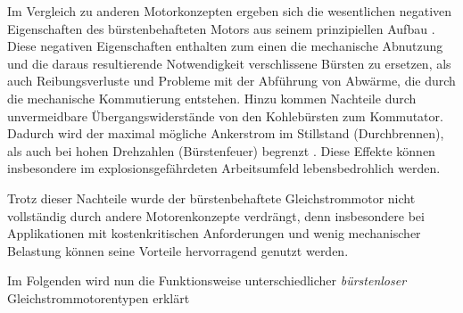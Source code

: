 \glqq{}Im  Vergleich  zu  anderen  Motorkonzepten  ergeben  sich  die  wesentlichen negativen Eigenschaften des bürstenbehafteten Motors aus seinem prinzipiellen Aufbau\grqq{} \parencite[S.52]{Probst2011}. Diese negativen Eigenschaften enthalten zum einen die mechanische Abnutzung und die daraus resultierende Notwendigkeit verschlissene Bürsten zu ersetzen, als auch Reibungsverluste und Probleme mit der Abführung von Abwärme, die durch die mechanische Kommutierung entstehen. Hinzu kommen Nachteile durch unvermeidbare Übergangswiderstände von den Kohlebürsten zum Kommutator. Dadurch wird der maximal mögliche Ankerstrom im Stillstand (Durchbrennen), als auch bei hohen Drehzahlen (Bürstenfeuer) begrenzt \parencite[vgl.][S.52]{Probst2011}. Diese Effekte können insbesondere im explosionsgefährdeten Arbeitsumfeld lebensbedrohlich werden.

Trotz dieser Nachteile wurde der bürstenbehaftete Gleichstrommotor nicht vollständig durch andere Motorenkonzepte verdrängt, denn insbesondere bei Applikationen mit kostenkritischen Anforderungen und wenig mechanischer Belastung können seine Vorteile hervorragend genutzt werden.

Im Folgenden wird nun die Funktionsweise unterschiedlicher \emph{bürstenloser} Gleichstrommotorentypen erklärt

